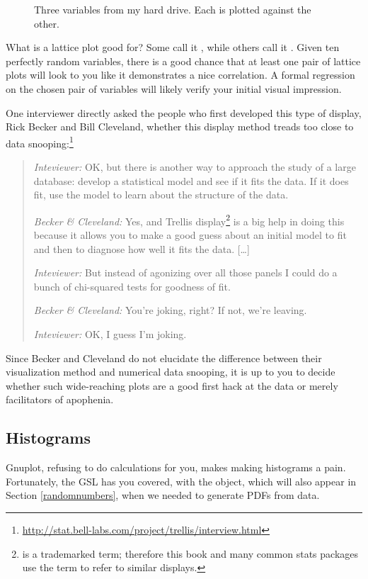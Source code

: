 \begin{figure}
\caption{Three variables from my hard drive. Each is plotted against the
other.}\label{trellis}
\end{figure}

What is a lattice plot good for? Some call it , while others call it . Given ten perfectly
random variables, there is a good chance that at least one pair of
lattice plots will look to you like it demonstrates a nice correlation.
A formal regression on the chosen pair of variables will likely
verify your initial visual impression. 

One interviewer directly asked the people who first developed
this type of display, Rick Becker and Bill Cleveland,
whether this display method treads too close to data
snooping:\footnote{\url{http://stat.bell-labs.com/project/trellis/interview.html}}

\begin{quote}
{\em Inteviewer:} OK, but there is another way to approach the study of a large database:
develop a statistical model and see if it fits the data. If it does fit,
use the model to learn about the structure of the data.

{\em Becker \& Cleveland:} Yes, and Trellis
display\footnote{ is a trademarked term; therefore
this book and many common stats packages use the term 
to refer to similar displays.} is a big help in doing this because it
allows you to make a good guess about an initial model to fit and then
to diagnose how well it fits the data. [\dots]

{\em Inteviewer:} But instead of agonizing over all those panels I could do a bunch of
chi-squared tests for goodness of fit.

{\em Becker \& Cleveland:} You're joking, right? If not, we're leaving.

{\em Inteviewer:} OK, I guess I'm joking.
\end{quote}

Since Becker and Cleveland do not elucidate the difference between their
visualization method and numerical data snooping, it is up to you to
decide whether such wide-reaching plots are a good first hack at the
data or merely facilitators of apophenia.

\subsection{Histograms} \label{histosec}
Gnuplot, refusing to do calculations for you,
makes making histograms a pain.  Fortunately, the GSL has you covered,
with the  object, which will also appear
in Section \ref{randomnumbers}, when we needed to generate PDFs from data.

